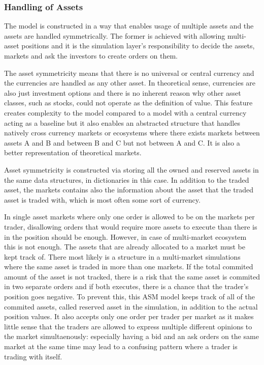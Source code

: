 

\subsubsection{Handling of Assets}

The model is constructed in a way that enables usage of multiple assets
and the assets are handled symmetrically. The former is achieved with
allowing multi-asset positions and it is the simulation layer's 
responsibility to decide the assets, markets and ask the investors
to create orders on them.

The asset symmetricity means that there is no universal or central currency 
and the currencies are handled as any other asset. In theoretical sense, 
currencies are also just investment options and there is no inherent reason why other 
asset classes, such as stocks, could not operate as the definition 
of value. This feature creates complexity to the model compared to a model
with a central currency acting as a baseline but it also enables an
abstracted structure that handles natively cross currency
markets or ecosystems where there exists markets between assets A and 
B and between B and C but not between A and C. It is also a better 
representation of theoretical markets.

Asset symmetricity is constructed via storing all the owned and reserved
assets in the same data structures, in dictionaries in this case. In addition
to the traded asset, the markets contains also the information about the asset
that the traded asset is traded with, which is most often some sort of currency. 

In single asset markets where only one order is allowed to be on the markets
per trader, disallowing orders that would require more assets to execute
than there is in the position should be enough. However, in case of multi-market
ecosystem this is not enough. The assets that are already allocated to 
a market must be kept track of. There most likely is a structure in a multi-market
simulations where the same asset is traded in more than one markets. If the
total commited amount of the asset is not tracked, there is a risk that the
same asset is commited in two separate orders and if both executes,
there is a chance that the trader's position goes negative. To prevent this,
this ASM model keeps track of all of the commited assets, called reserved
asset in the simulation, in addition to the actual position values. It also
accepts only one order per trader per market as it makes little sense that
the traders are allowed to express multiple different opinions to the market 
simultaenously: especially having a bid and an ask orders on the same market
at the same time may lead to a confusing pattern where a trader is trading with
itself. 


